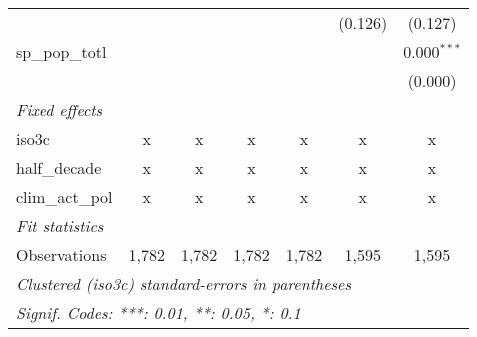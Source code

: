 \begin{tabular}{lcccccc}
                                               &         &         &         &             & (0.126)        & (0.127)\\   
   sp\_pop\_totl                               &         &         &         &             &                & 0.000$^{***}$\\   
                                               &         &         &         &             &                & (0.000)\\   
   \emph{Fixed effects}\\
   iso3c                                       & x       & x       & x       & x           & x              & x\\  
   half\_decade                                & x       & x       & x       & x           & x              & x\\  
   clim\_act\_pol                              & x       & x       & x       & x           & x              & x\\  
   \midrule \emph{Fit statistics}\\
   Observations                                & 1,782   & 1,782   & 1,782   & 1,782       & 1,595          & 1,595\\  
   \midrule
   \multicolumn{7}{l}{\emph{Clustered (iso3c) standard-errors in parentheses}}\\
   \multicolumn{7}{l}{\emph{Signif. Codes: ***: 0.01, **: 0.05, *: 0.1}}\\
\end{tabular}
\par\endgroup


